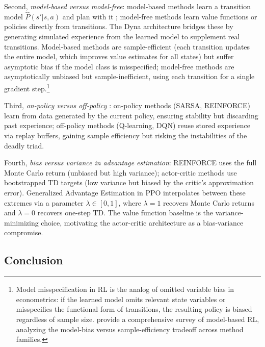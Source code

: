 Second, \emph{model-based versus model-free}: model-based methods learn a transition model $\hat{P}(s'|s,a)$ and plan with it \citep{sutton1990}; model-free methods learn value functions or policies directly from transitions. The Dyna architecture \citep{sutton1990} bridges these by generating simulated experience from the learned model to supplement real transitions. Model-based methods are sample-efficient (each transition updates the entire model, which improves value estimates for all states) but suffer asymptotic bias if the model class is misspecified; model-free methods are asymptotically unbiased but sample-inefficient, using each transition for a single gradient step.\footnote{Model misspecification in RL is the analog of omitted variable bias in econometrics: if the learned model omits relevant state variables or misspecifies the functional form of transitions, the resulting policy is biased regardless of sample size. \citet{moerland2023} provide a comprehensive survey of model-based RL, analyzing the model-bias versus sample-efficiency tradeoff across method families.}

Third, \emph{on-policy versus off-policy} \citep[Ch.~5--7]{sutton2018}: on-policy methods (SARSA, REINFORCE) learn from data generated by the current policy, ensuring stability but discarding past experience; off-policy methods (Q-learning, DQN) reuse stored experience via replay buffers, gaining sample efficiency but risking the instabilities of the deadly triad.

Fourth, \emph{bias versus variance in advantage estimation}: REINFORCE uses the full Monte Carlo return (unbiased but high variance); actor-critic methods \citep{konda2000} use bootstrapped TD targets (low variance but biased by the critic's approximation error). Generalized Advantage Estimation in PPO \citep{Schulman2015} interpolates between these extremes via a parameter $\lambda \in [0,1]$, where $\lambda = 1$ recovers Monte Carlo returns and $\lambda = 0$ recovers one-step TD. The value function baseline is the variance-minimizing choice, motivating the actor-critic architecture as a bias-variance compromise.

\subsection{Conclusion}
\label{sec:ch2_conclusion}

